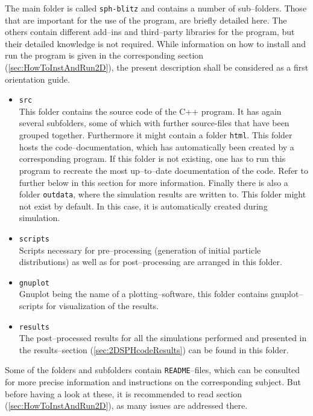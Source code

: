 \documentclass{report}
\begin{document}
The main folder is called {\tt sph-blitz} and contains a number of sub--folders. Those that are important for the use of the program, are briefly detailed here. The others contain different add--ins and third--party libraries for the program, but their detailed knowledge is not required.
While information on how to install and run the program is given in the corresponding section (\ref{sec:HowToInstAndRun2D}), the present description shall be considered as a first orientation guide. 
\begin{itemize}
 \item {\tt src}\\
This folder contains the source code of the C++ program. It has again several subfolders, some of which with further source-files that have been grouped together.
Furthermore it might contain a folder {\tt html}. This folder hosts the code--documentation, which has automatically been created by a corresponding program. If this folder is not existing, one has to run this program to recreate the most up--to--date documentation of the code. Refer to further below in this section for more information.
Finally there is also a folder {\tt outdata}, where the simulation results are written to. This folder might not exist by default. In this case, it is automatically created during simulation. 
\item {\tt scripts}\\
Scripts necessary for pre--processing (generation of initial particle distributions) as well as for post--processing  are arranged in this folder.
\item{\tt gnuplot}\\
Gnuplot being the name of a plotting--software, this folder contains gnuplot--scripts for visualization of the results.
\item{\tt results}\\
The post--processed results for all the simulations performed and presented in the results--section (\ref{sec:2DSPHcodeResults}) can be found in this folder. 


\end{itemize}
Some of the folders and subfolders contain {\tt README}--files, which can be consulted for more precise information and instructions on the corresponding subject. But before having a look at these, it is recommended to read section (\ref{sec:HowToInstAndRun2D}), as many issues are addressed there.
\end{document}
